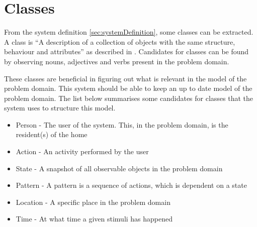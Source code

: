 \section{Classes}\label{sec:classes}
From the system definition \cref{sec:systemDefinition}, some classes can be extracted. A class is \enquote{A description of a collection of objects with the same structure, behaviour and attributes} as described in \cite{OOAD}. Candidates for classes can be found by observing nouns, adjectives and verbs present in the problem domain.

These classes are beneficial in figuring out what is relevant in the model of the problem domain. This system should be able to keep an up to date model of the problem domain. The list below summarises some candidates for classes that the system uses to structure this model.

\begin{itemize}
\item Person - The user of the system. This, in the problem domain, is the resident(s) of the home
\item Action - An activity performed by the user
\item State - A snapshot of all observable objects in the problem domain
\item Pattern - A pattern is a sequence of actions, which is dependent on a state
\item Location - A specific place in the problem domain
\item Time - At what time a given stimuli has happened
\end{itemize}
